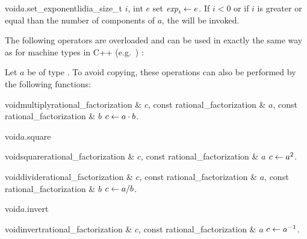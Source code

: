 \begin{fcode}{void}{$a$.set_exponent}{lidia_size_t $i$, int $e$}
  set $\mathit{exp}_i \leftarrow e$.  If $i < 0$ or if $i$ is greater or equal than the number of
  components of $a$, the \LEH will be invoked.
\end{fcode}



\ARTH

The following operators are overloaded and can be used in exactly the same way as for machine
types in C++ (e.g.~) :

\begin{center}
\end{center}

Let $a$ be of type .  To avoid copying, these operations can also
be performed by the following functions:

\begin{fcode}{void}{multiply}{rational_factorization & $c$, const rational_factorization & $a$,
    const rational_factorization & $b$}%
  $c \leftarrow a \cdot b$.
\end{fcode}

\begin{fcode}{void}{$a$.square}{}
\end{fcode}

\begin{fcode}{void}{square}{rational_factorization & $c$, const rational_factorization & $a$}
  $c \leftarrow a^2$.
\end{fcode}

\begin{fcode}{void}{divide}{rational_factorization & $c$, const rational_factorization & $a$,
    const rational_factorization & $b$}%
  $c \leftarrow a / b$.
\end{fcode}

\begin{fcode}{void}{$a$.invert}{}
\end{fcode}

\begin{fcode}{void}{invert}{rational_factorization & $c$, const rational_factorization & $a$}
  $c \leftarrow a^{-1}$.
\end{fcode}



\COMP

